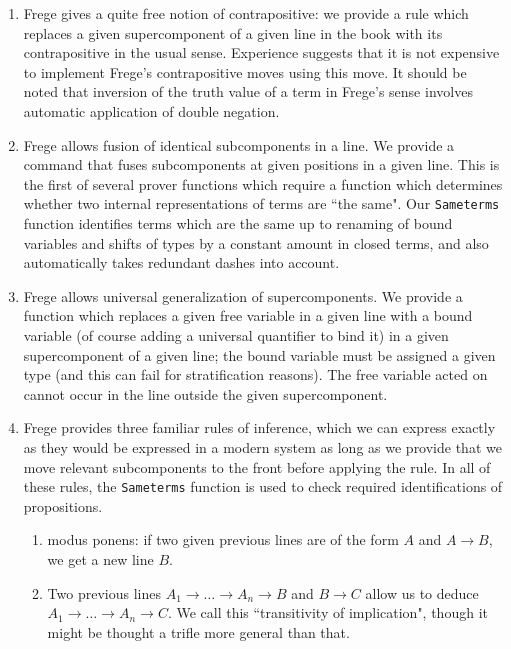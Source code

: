 \documentclass{article}
\begin{document}
{{\begin{enumerate}
\item Frege gives a quite free notion of contrapositive:  we provide a rule which replaces a given supercomponent of a given line in the book with its contrapositive in the usual sense.
Experience suggests that it is not expensive to implement Frege's contrapositive moves using this move.  It should be noted that inversion of the truth value of a term in Frege's sense involves automatic application of double negation.

\item Frege allows fusion of identical subcomponents in a line.  We provide a command that fuses subcomponents at given positions in a given line.  This is the first of several prover functions which require a function which determines whether two internal representations of terms are ``the same".  Our {\tt Sameterms\/} function identifies terms which are the same up to renaming of bound variables and shifts of types by a constant amount in closed terms, and also automatically takes redundant dashes into account.

\item Frege allows universal generalization of supercomponents.  We provide a function which replaces a given free variable in a given line with a bound variable (of course adding a universal quantifier to bind it) in a given supercomponent of a given line;  the bound variable must be assigned a given type (and this can fail for stratification reasons).  The free variable acted on cannot occur in the line outside the given supercomponent.

\item Frege provides three familiar rules of inference, which we can express exactly as they would be expressed in a modern system as long as we provide that
we move relevant subcomponents to the front before applying the rule.  In all of these rules, the {\tt Sameterms\/} function is used to check required identifications of propositions.


\begin{enumerate}

\item modus ponens:  if two given previous lines are of the form $A$ and $A \rightarrow B$, we get a new line $B$.

\item Two previous lines $A_1 \rightarrow \ldots \rightarrow A_n  \rightarrow B$ and $B \rightarrow C$  allow us to deduce $A_1 \rightarrow \ldots \rightarrow A_n  \rightarrow C$.  We call this ``transitivity of implication", though it might be thought a trifle more general than that.


\end{enumerate}
\end{enumerate}}}
\end{document}

